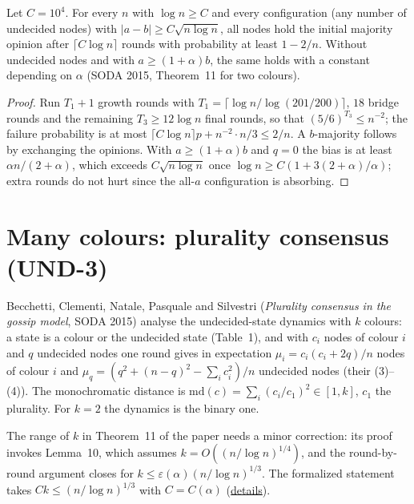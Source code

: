 \begin{theorem}\label{thm:majority}
\leanok{}
Let $C=10^4$. For every $n$ with $\log n\ge C$ and every configuration (any number of undecided
nodes) with $|a-b|\ge C\sqrt{n\log n}$, all nodes hold the initial majority opinion after
$\lceil C\log n\rceil$ rounds with probability at least $1-2/n$. Without undecided nodes and with
$a\ge(1+\alpha)b$, the same holds with a constant depending on $\alpha$ (SODA 2015, Theorem~11
for two colours).
\end{theorem}
\begin{proof}\leanok
Run $T_1+1$ growth rounds with $T_1=\lceil\log n/\log(201/200)\rceil$, $18$ bridge rounds and the
remaining $T_3\ge 12\log n$ final rounds, so that $(5/6)^{T_3}\le n^{-2}$; the failure
probability is at most $\lceil C\log n\rceil p+n^{-2}\cdot n/3\le 2/n$. A $b$-majority follows by
exchanging the opinions. With $a\ge(1+\alpha)b$ and $q=0$ the bias is at least $\alpha n/(2+\alpha)$,
which exceeds $C\sqrt{n\log n}$ once $\log n\ge C(1+3(2+\alpha)/\alpha)$; extra rounds do not hurt
since the all-$a$ configuration is absorbing.
\end{proof}

\section{Many colours: plurality consensus (UND-3)}\label{sec:bcnps-plurality}
Becchetti, Clementi, Natale, Pasquale and Silvestri (\emph{Plurality consensus in the gossip
model}, SODA 2015) analyse the undecided-state dynamics with $k$ colours: a state is a colour or
the undecided state (Table~1), and with $c_i$ nodes of colour $i$ and $q$ undecided nodes one
round gives in expectation $\mu_i=c_i(c_i+2q)/n$ nodes of colour $i$ and
$\mu_q=(q^2+(n-q)^2-\sum_i c_i^2)/n$ undecided nodes (their (3)--(4)). The monochromatic distance
is $\mathrm{md}(c)=\sum_i(c_i/c_1)^2\in[1,k]$, $c_1$ the plurality. For $k=2$ the dynamics is the
binary one.

The range of $k$ in Theorem~11 of the paper needs a minor correction: its proof invokes Lemma~10,
which assumes $k=O((n/\log n)^{1/4})$, and the round-by-round argument closes for
$k\le\varepsilon(\alpha)(n/\log n)^{1/3}$. The formalized statement takes
$Ck\le(n/\log n)^{1/3}$ with $C=C(\alpha)$
(\href{https://github.com/formal-dynamics/leanamics/blob/main/undecided/FORMALIZATION_DIFFERENCES.md#the-dynamics-with-k-colours-plurality-roadmap-und-3}{details}).

